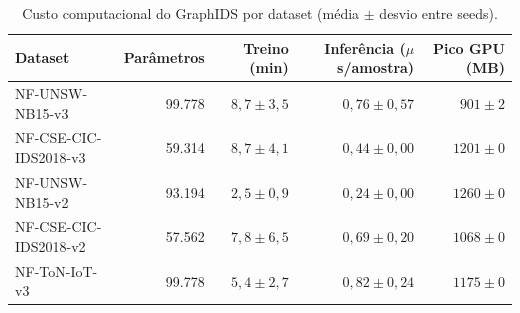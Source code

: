 \begin{table}[ht]
\centering
\caption{Custo computacional do GraphIDS por dataset (média $\pm$ desvio entre seeds).}
\label{tab:custo}
\begin{tabular}{lrrrr}
\toprule
Dataset & Parâmetros & Treino (min) & Inferência ($\mu$s/amostra) & Pico GPU (MB) \\
\midrule
NF-UNSW-NB15-v3 & 99.778 & $8,7 \pm 3,5$ & $0,76 \pm 0,57$ & $901 \pm 2$ \\
NF-CSE-CIC-IDS2018-v3 & 59.314 & $8,7 \pm 4,1$ & $0,44 \pm 0,00$ & $1201 \pm 0$ \\
NF-UNSW-NB15-v2 & 93.194 & $2,5 \pm 0,9$ & $0,24 \pm 0,00$ & $1260 \pm 0$ \\
NF-CSE-CIC-IDS2018-v2 & 57.562 & $7,8 \pm 6,5$ & $0,69 \pm 0,20$ & $1068 \pm 0$ \\
NF-ToN-IoT-v3 & 99.778 & $5,4 \pm 2,7$ & $0,82 \pm 0,24$ & $1175 \pm 0$ \\
\bottomrule
\end{tabular}
\end{table}
